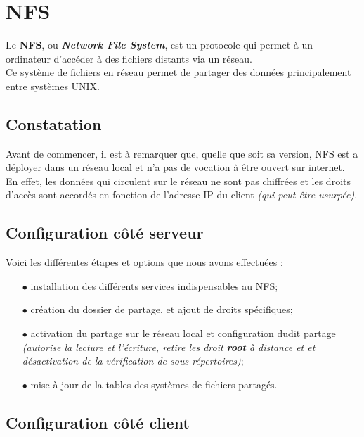 \section{NFS}
\label{sec:nfs}

Le \textbf{NFS}, ou \textit{\textbf{Network File System}}, est un protocole qui
permet à un ordinateur d'accéder à des fichiers distants via un réseau. \\
Ce système de fichiers en réseau permet de partager des données principalement
entre systèmes UNIX.


\subsection{Constatation}
\label{subsec:constatation}

Avant de commencer, il est à remarquer que, quelle que soit sa version, NFS est
a déployer dans un réseau local et n'a pas de vocation à être ouvert sur internet. \\
En effet, les données qui circulent sur le réseau ne sont pas chiffrées et les
droits d'accès sont accordés en fonction de l'adresse IP du client
\textit{(qui peut être usurpée)}.


\subsection{Configuration côté serveur}
\label{subsec:config-serveur}

Voici les différentes étapes et options que nous avons effectuées :
\begin{itemize}

    \item[$\bullet$] installation des différents services indispensables au NFS;
    \item[$\bullet$] création du dossier de partage, et ajout de droits
    spécifiques;
    \item[$\bullet$] activation du partage sur le réseau local et configuration
    dudit partage \textit{(autorise la lecture et l'écriture, retire les droit
    \textbf{root} à distance et et désactivation de la vérification de sous-répertoires)};
    \item[$\bullet$] mise à jour de la tables des systèmes de fichiers partagés.

\end{itemize}


\subsection{Configuration côté client}
\label{subsec:config-client}

